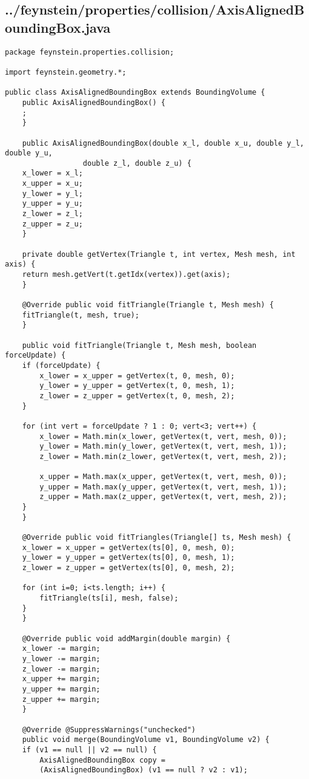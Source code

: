 \subsection*{../feynstein/properties/collision/AxisAlignedBoundingBox.java}
\begin{lstlisting}
package feynstein.properties.collision;

import feynstein.geometry.*;

public class AxisAlignedBoundingBox extends BoundingVolume {
    public AxisAlignedBoundingBox() {
	;
    }

    public AxisAlignedBoundingBox(double x_l, double x_u, double y_l, double y_u,
				  double z_l, double z_u) {
	x_lower = x_l;
	x_upper = x_u;
	y_lower = y_l;
	y_upper = y_u;
	z_lower = z_l;
	z_upper = z_u;
    }

    private double getVertex(Triangle t, int vertex, Mesh mesh, int axis) {
	return mesh.getVert(t.getIdx(vertex)).get(axis);
    }

    @Override public void fitTriangle(Triangle t, Mesh mesh) {
	fitTriangle(t, mesh, true);
    }

    public void fitTriangle(Triangle t, Mesh mesh, boolean forceUpdate) {
	if (forceUpdate) {
	    x_lower = x_upper = getVertex(t, 0, mesh, 0);
	    y_lower = y_upper = getVertex(t, 0, mesh, 1);
	    z_lower = z_upper = getVertex(t, 0, mesh, 2);
	}

	for (int vert = forceUpdate ? 1 : 0; vert<3; vert++) {
	    x_lower = Math.min(x_lower, getVertex(t, vert, mesh, 0));
	    y_lower = Math.min(y_lower, getVertex(t, vert, mesh, 1));
	    z_lower = Math.min(z_lower, getVertex(t, vert, mesh, 2));

	    x_upper = Math.max(x_upper, getVertex(t, vert, mesh, 0));
	    y_upper = Math.max(y_upper, getVertex(t, vert, mesh, 1));
	    z_upper = Math.max(z_upper, getVertex(t, vert, mesh, 2));
	}
    }

    @Override public void fitTriangles(Triangle[] ts, Mesh mesh) {
	x_lower = x_upper = getVertex(ts[0], 0, mesh, 0);
	y_lower = y_upper = getVertex(ts[0], 0, mesh, 1);
	z_lower = z_upper = getVertex(ts[0], 0, mesh, 2);

	for (int i=0; i<ts.length; i++) {
	    fitTriangle(ts[i], mesh, false);
	}
    }

    @Override public void addMargin(double margin) {
	x_lower -= margin;
	y_lower -= margin;
	z_lower -= margin;
	x_upper += margin;
	y_upper += margin;
	z_upper += margin;
    }

    @Override @SuppressWarnings("unchecked")
    public void merge(BoundingVolume v1, BoundingVolume v2) {
	if (v1 == null || v2 == null) {
	    AxisAlignedBoundingBox copy = 
		(AxisAlignedBoundingBox) (v1 == null ? v2 : v1);
	    

\end{lstlisting}
